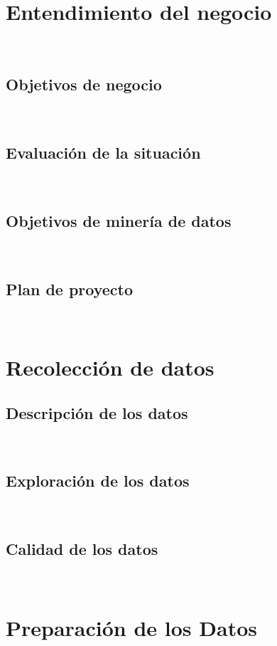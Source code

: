 \fontsize{14}{15}\selectfont

\section{Entendimiento del negocio}
\blindtext\\
\subsection{Objetivos de negocio}
\blindtext\\
\subsection{Evaluación de la situación}
\blindtext\\
\subsection{Objetivos de minería de datos}
\blindtext\\
\subsection{Plan de proyecto}
\blindtext\\

\section{Recolección de datos}
\blindtext
\subsection{Descripción de los datos}
\blindtext\\
\subsection{Exploración de los datos}
\blindtext\\
\subsection{Calidad de los datos}
\blindtext\\


\section{Preparación de los Datos}
\blindtext
